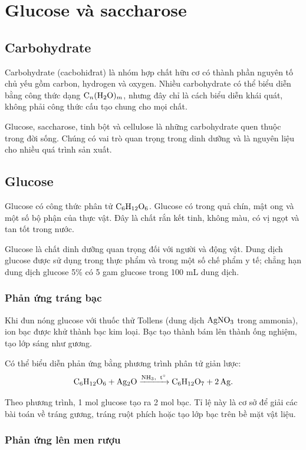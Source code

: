 \section{Glucose và saccharose}

\subsection{Carbohydrate}

Carbohydrate (cacbohiđrat) là nhóm hợp chất hữu cơ có thành phần nguyên tố chủ yếu gồm carbon, hydrogen và oxygen. Nhiều carbohydrate có thể biểu diễn bằng công thức dạng \(\ce{C_n(H2O)_m}\), nhưng đây chỉ là cách biểu diễn khái quát, không phải công thức cấu tạo chung cho mọi chất.

Glucose, saccharose, tinh bột và cellulose là những carbohydrate quen thuộc trong đời sống. Chúng có vai trò quan trọng trong dinh dưỡng và là nguyên liệu cho nhiều quá trình sản xuất.

\subsection{Glucose}

Glucose có công thức phân tử \(\ce{C6H12O6}\). Glucose có trong quả chín, mật ong và một số bộ phận của thực vật. Đây là chất rắn kết tinh, không màu, có vị ngọt và tan tốt trong nước.

Glucose là chất dinh dưỡng quan trọng đối với người và động vật. Dung dịch glucose được sử dụng trong thực phẩm và trong một số chế phẩm y tế; chẳng hạn dung dịch glucose 5\% có 5 gam glucose trong 100 mL dung dịch.

\subsubsection*{Phản ứng tráng bạc}

Khi đun nóng glucose với thuốc thử Tollens (dung dịch \(\ce{AgNO3}\) trong ammonia), ion bạc được khử thành bạc kim loại. Bạc tạo thành bám lên thành ống nghiệm, tạo lớp sáng như gương.

Có thể biểu diễn phản ứng bằng phương trình phân tử giản lược:
\[
\ce{C6H12O6 + Ag2O ->[NH3,\ t^\circ] C6H12O7 + 2Ag}.
\]

Theo phương trình, 1 mol glucose tạo ra 2 mol bạc. Tỉ lệ này là cơ sở để giải các bài toán về tráng gương, tráng ruột phích hoặc tạo lớp bạc trên bề mặt vật liệu.

\subsubsection*{Phản ứng lên men rượu}

